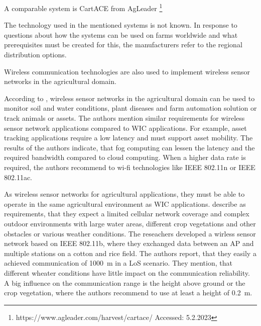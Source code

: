 A comparable system is CartACE from AgLeader \footnote{https://www.agleader.com/harvest/cartace/ Accessed: 5.2.2023}

The technology used in the mentioned systems is not known. In response to questions about how the systems can be used on farms worldwide and what prerequisites must be created for this, the manufacturers refer to the regional distribution options.



Wireless communication technologies are also used to implement wireless sensor networks in the agricultural domain.

According to \textcite{Ahmed2020}, wireless sensor networks in the agricultural domain can be used to monitor soil and water conditions, plant diseases and farm automation solution
or track animals or assets. The authors mention similar requirements for wireless sensor network applications  compared to \ac{WIC} applications.
For example, asset tracking applications require a low latency and must support asset mobility.
The results of the authors indicate, that fog computing can lessen the latency and the required bandwidth compared to cloud computing.
When a higher data rate is required, the authors recommend to wi-fi technologies like IEEE 802.11n or IEEE 802.11ac.

As wireless sensor networks for agricultural applications, they must be able to operate in the same agricultural environment as \ac{WIC} applications.
\textcite{Brinkhoff2020} describe as requirements, that they expect a limited cellular network coverage and complex outdoor
environments with large water areas, different crop vegetations and other obstacles or various weather conditions. The
reseachers developed a wirless sensor network based on IEEE 802.11b, where they exchanged data between an \ac{AP} and multiple stations on
a cotton and rice field. The authors report, that they easily a achieved communication of \SI{1000}{\metre} in a \ac{LoS} scenario.
They mention, that different wheater conditions have little impact on the communication reliability. A big influence on the communication range is
the height above ground or the crop vegetation, where the authors recommend to use at least a height of \SI{0.2}{\metre}.



